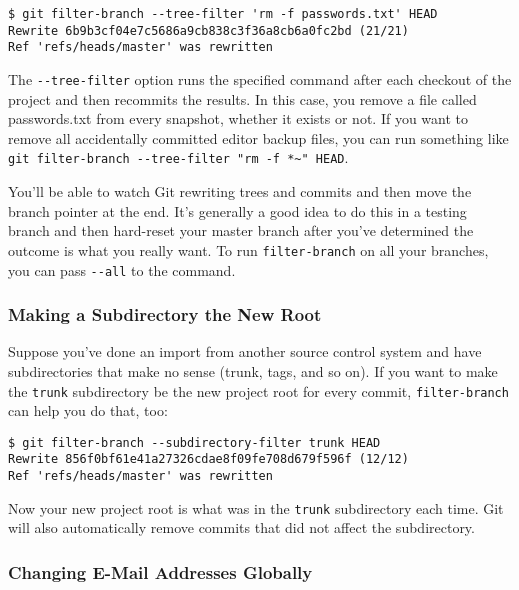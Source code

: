 \documentclass[a4paper]{book}
\begin{document}
\begin{shaded}\begin{verbatim}
$ git filter-branch --tree-filter 'rm -f passwords.txt' HEAD
Rewrite 6b9b3cf04e7c5686a9cb838c3f36a8cb6a0fc2bd (21/21)
Ref 'refs/heads/master' was rewritten
\end{verbatim}\end{shaded}

The \texttt{-{}-tree-filter} option runs the specified command after each checkout of the project and then recommits the results. In this case, you remove a file called passwords.txt from every snapshot, whether it exists or not. If you want to remove all accidentally committed editor backup files, you can run something like \texttt{git filter-branch -{}-tree-filter "rm -f *\textasciitilde{}" HEAD}.

You'll be able to watch Git rewriting trees and commits and then move the branch pointer at the end. It's generally a good idea to do this in a testing branch and then hard-reset your master branch after you've determined the outcome is what you really want. To run \texttt{filter-branch} on all your branches, you can pass \texttt{-{}-all} to the command.

\subsubsection{Making a Subdirectory the New Root}

Suppose you've done an import from another source control system and have subdirectories that make no sense (trunk, tags, and so on). If you want to make the \texttt{trunk} subdirectory be the new project root for every commit, \texttt{filter-branch} can help you do that, too:

\begin{shaded}\begin{verbatim}
$ git filter-branch --subdirectory-filter trunk HEAD
Rewrite 856f0bf61e41a27326cdae8f09fe708d679f596f (12/12)
Ref 'refs/heads/master' was rewritten
\end{verbatim}\end{shaded}

Now your new project root is what was in the \texttt{trunk} subdirectory each time. Git will also automatically remove commits that did not affect the subdirectory.

\subsubsection{Changing E-Mail Addresses Globally}
\end{document}
